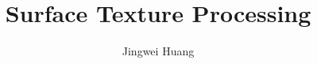 \documentclass{report}
\begin{document}
\title{Surface Texture Processing}
\author{Jingwei Huang}

\beforepreface


\afterpreface


















\end{document}

